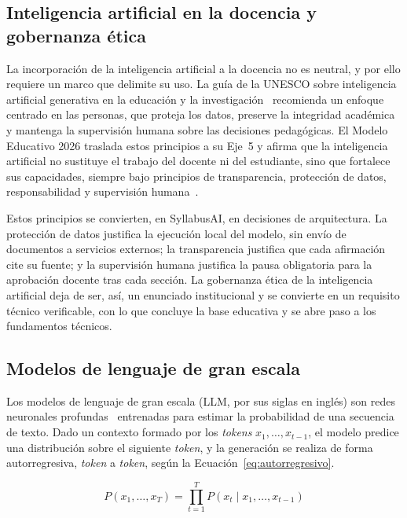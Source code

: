 \subsection{Inteligencia artificial en la docencia y gobernanza ética}
La incorporación de la inteligencia artificial a la docencia no es neutral, y por ello requiere un marco que delimite su uso. La guía de la UNESCO sobre inteligencia artificial generativa en la educación y la investigación~\cite{unesco2023guidance} recomienda un enfoque centrado en las personas, que proteja los datos, preserve la integridad académica y mantenga la supervisión humana sobre las decisiones pedagógicas. El Modelo Educativo 2026 traslada estos principios a su Eje~5 y afirma que la inteligencia artificial no sustituye el trabajo del docente ni del estudiante, sino que fortalece sus capacidades, siempre bajo principios de transparencia, protección de datos, responsabilidad y supervisión humana~\cite{uti2026modelo}.

Estos principios se convierten, en SyllabusAI, en decisiones de arquitectura. La protección de datos justifica la ejecución local del modelo, sin envío de documentos a servicios externos; la transparencia justifica que cada afirmación cite su fuente; y la supervisión humana justifica la pausa obligatoria para la aprobación docente tras cada sección. La gobernanza ética de la inteligencia artificial deja de ser, así, un enunciado institucional y se convierte en un requisito técnico verificable, con lo que concluye la base educativa y se abre paso a los fundamentos técnicos.

\subsection{Modelos de lenguaje de gran escala}
Los modelos de lenguaje de gran escala (LLM, por sus siglas en inglés) son redes neuronales profundas~\cite{goodfellow2016deep} entrenadas para estimar la probabilidad de una secuencia de texto. Dado un contexto formado por los \textit{tokens} $x_1, \dots, x_{t-1}$, el modelo predice una distribución sobre el siguiente \textit{token}, y la generación se realiza de forma autorregresiva, \textit{token} a \textit{token}, según la Ecuación~\ref{eq:autorregresivo}.

\begin{equation}
\label{eq:autorregresivo}
P(x_1, \dots, x_T) = \prod_{t=1}^{T} P(x_t \mid x_1, \dots, x_{t-1})
\end{equation}


